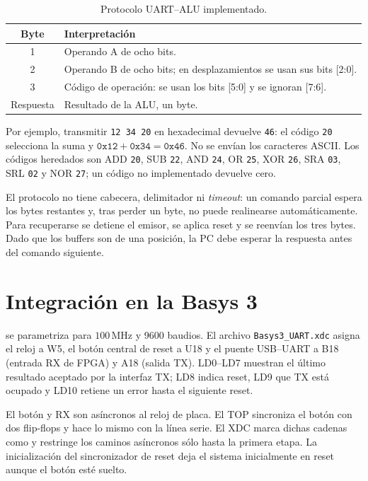 \documentclass[11pt,a4paper]{article}
\newcommand{\verilog}[1]{\texttt{\detokenize{#1}}}
\begin{document}
\begin{table}[ht]
\centering
\caption{Protocolo UART--ALU implementado.}
\label{tab:protocol}
\renewcommand{\arraystretch}{1.12}
\begin{tabular}{c p{8.5cm}}
\toprule
\textbf{Byte} & \textbf{Interpretación}\\
\midrule
1 & Operando A de ocho bits.\\
2 & Operando B de ocho bits; en desplazamientos se usan sus bits [2:0].\\
3 & Código de operación: se usan los bits [5:0] y se ignoran [7:6].\\
Respuesta & Resultado de la ALU, un byte.\\
\bottomrule
\end{tabular}
\end{table}

Por ejemplo, transmitir \texttt{12 34 20} en hexadecimal devuelve \texttt{46}: el código \texttt{20} selecciona la suma y $\texttt{0x12}+\texttt{0x34}=\texttt{0x46}$. No se envían los caracteres ASCII. Los códigos heredados son ADD \texttt{20}, SUB \texttt{22}, AND \texttt{24}, OR \texttt{25}, XOR \texttt{26}, SRA \texttt{03}, SRL \texttt{02} y NOR \texttt{27}; un código no implementado devuelve cero.

El protocolo no tiene cabecera, delimitador ni \textit{timeout}: un comando parcial espera los bytes restantes y, tras perder un byte, no puede realinearse automáticamente. Para recuperarse se detiene el emisor, se aplica reset y se reenvían los tres bytes. Dado que los buffers son de una posición, la PC debe esperar la respuesta antes del comando siguiente.

\section{Integración en la Basys 3}

\verilog{uart_top} se parametriza para $100\,\mathrm{MHz}$ y 9600 baudios. El archivo \texttt{Basys3\_UART.xdc} asigna el reloj a W5, el botón central de reset a U18 y el puente USB--UART a B18 (entrada RX de FPGA) y A18 (salida TX). LD0--LD7 muestran el último resultado aceptado por la interfaz TX; LD8 indica reset, LD9 que TX está ocupado y LD10 retiene un error hasta el siguiente reset.

El botón y RX son asíncronos al reloj de placa. El TOP sincroniza el botón con dos flip-flops y \verilog{uart_rx} hace lo mismo con la línea serie. El XDC marca dichas cadenas como \verilog{ASYNC_REG} y restringe los caminos asíncronos sólo hasta la primera etapa. La inicialización \verilog{2'b11} del sincronizador de reset deja el sistema inicialmente en reset aunque el botón esté suelto.
\end{document}
